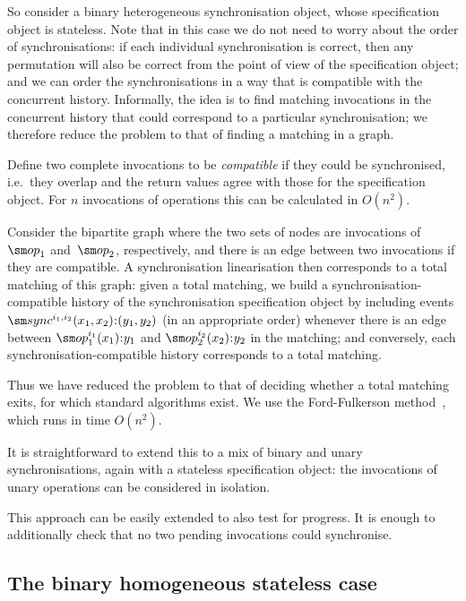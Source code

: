 So consider a binary heterogeneous synchronisation object, whose specification
object is stateless.  Note that in this case we do not need to worry about the
order of synchronisations: if each individual synchronisation is correct, then
any permutation will also be correct from the point of view of the
specification object; and we can order the synchronisations in a way that is
compatible with the concurrent history.  Informally, the idea is to find
matching invocations in the concurrent history that could correspond to a
particular synchronisation; we therefore reduce the problem to that of finding
a matching in a graph.

Define two complete invocations to be \emph{compatible} if they could be
synchronised, i.e.~they overlap and the return values agree with those for the
specification object.  For $n$ invocations of operations this can be
calculated in $O(n^2)$.

Consider the bipartite graph where the two sets of nodes are invocations
of~$\op_1$ and~$\op_2$, respectively, and there is an edge between two
invocations if they are compatible.  A synchronisation linearisation then
corresponds to a total matching of this graph: given a total matching, we
build a synchronisation-compatible history of the synchronisation
specification object by including events
$\sync^{i_1,i_2}(x_1,x_2)\::(y_1,y_2)$ (in an appropriate order) whenever
there is an edge between $\op_1^{i_1}(x_1)\::y_1$ and $\op_2^{i_2}(x_2)\::y_2$
in the matching; and conversely, each synchronisation-compatible history
corresponds to a total matching.

Thus we have reduced the problem to that of deciding whether a total matching
exits, for which standard algorithms exist.  We use the Ford-Fulkerson
method~\cite{ford-fulkerson}, which runs in time $O(n^2)$.

It is straightforward to extend this to a mix of binary and unary
synchronisations, again with a stateless specification object: the invocations
of unary operations can be considered in isolation.  

This approach can be easily extended to also test for progress.  It is enough
to additionally check that no two pending invocations could synchronise.


\subsection{The binary homogeneous stateless case}
\label{sec:binary-homogeneous} 

